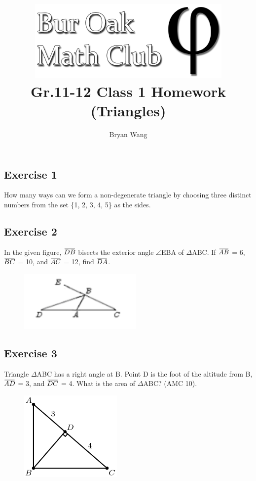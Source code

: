 \documentclass[12pt]{article}
\author{Bryan Wang}
\title{\includegraphics[width=10cm]{Bur Oak Math Club Banner Bold.png}\\\vspace{0.25in} Gr.11-12 Class 1 Homework (Triangles)}
\newcommand{\overbar}[1]{\mkern 1.5mu\overline{\mkern-1.5mu#1\mkern-1.5mu}\mkern 1.5mu}
\begin{document}
\maketitle

\subsection*{Exercise 1}
How many ways can we form a non-degenerate triangle by choosing three distinct numbers from the set \{1, 2, 3, 4, 5\} as the sides.
\vspace{1.5in} %

\subsection*{Exercise 2}
In the given figure, $\overbar{DB}$ bisects the exterior angle $\angle$EBA of $\Delta$ABC. If $\overbar{AB}$ = 6, $\overbar{BC}$ = 10, and $\overbar{AC}$ = 12, find $\overbar{DA}$.
\begin{figure}[htp]
    \includegraphics[width=6cm]{img1.png}
\end{figure}
\vspace{1in} %

\subsection*{Exercise 3}
Triangle $\Delta$ABC has a right angle at B. Point D is the foot of the altitude from B, $\overbar{AD}$ = 3, and $\overbar{DC}$ = 4. What is the area of $\Delta$ABC? (AMC 10).
\begin{figure}[htp]
    \includegraphics[width=5cm]{img3.png}
\end{figure}
\vspace{1.5in}
\end{document}
